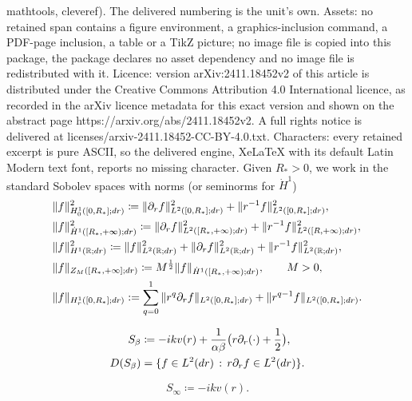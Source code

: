 \documentclass[10pt,a4paper]{amsart}
\def\RR {\mathbb{R}}
\def\dd{{\rm d}}
\def\de{{\partial}}
\begin{document}
mathtools, cleveref). The delivered numbering is the unit's own. Assets: no retained span contains a figure environment, a graphics-inclusion command, a PDF-page inclusion, a table or a TikZ picture; no image file is copied into this package, the package declares no asset dependency and no image file is redistributed with it. Licence: version arXiv:2411.18452v2 of this article is distributed under the Creative Commons Attribution 4.0 International licence, as recorded in the arXiv licence metadata for this exact version and shown on the abstract page https://arxiv.org/abs/2411.18452v2. A full rights notice is delivered at licenses/arxiv-2411.18452-CC-BY-4.0.txt. Characters: every retained excerpt is pure ASCII, so the delivered engine, XeLaTeX with its default Latin Modern text font, reports no missing character.
Given $ R_*>0$, we work in the standard Sobolev spaces with norms (or seminorms for $\dot{H}^1$) \begin{align}
\label{def:H10}&\|f\|_{H^1_0([0,R_*];\dd r)}^2\coloneqq \|\de_r f\|_{L^2([0,R_*];\dd r)}^2+\|r^{-1}f\|^2_{L^2([0,R_*];\dd r)},\\
\label{def:H1dot}&\|f\|_{\dot{H}^1([R_*,+\infty);\dd r)}^2\coloneqq \|\de_r f\|_{L^2([R_*,+\infty);\dd r)}^2+\|r^{-1}f\|^2_{L^2([R,+\infty);\dd r)},\\
\label{def:H1}&\|f\|_{H^1(\RR;\dd r)}^2\coloneqq \|f\|_{L^2(\RR;\dd r)}^2 +\|\de_r f\|_{L^2(\RR;\dd r)}^2+\|r^{-1}f\|^2_{L^2(\RR;\dd r)},\\
\label{def:ZM} &\|f\|_{Z_M([R_*,+\infty];\dd r)}\coloneqq M^\frac12\|f\|_{\dot{H}^1([R_*,+\infty);\dd r)}, \qquad M>0,\\
\label{def:H1r} &\|f\|_{H^1_r([0,R_*];\dd r)}:=\sum_{q=0}^1\|r^q\de_r f\|_{L^2([0,R_*];\dd r)}+\|r^{q-1}f\|_{L^2([0,R_*];\dd r)}.
\end{align}

\begin{align}
    \label{def:Sbeta}S_\beta&\coloneqq-ikv(r) + \frac{1}{\alpha\beta} \big(r\partial_r(\cdot) + \frac{1}{2}\big),\\
    D(S_\beta)& =\{f\in L^2(\dd r) \, : \, r\de_r f \in L^2(\dd r) \}.
\end{align}

\begin{equation}
\label{def:Sinf}
S_\infty\coloneqq -ikv(r).
\end{equation}
\end{document}
